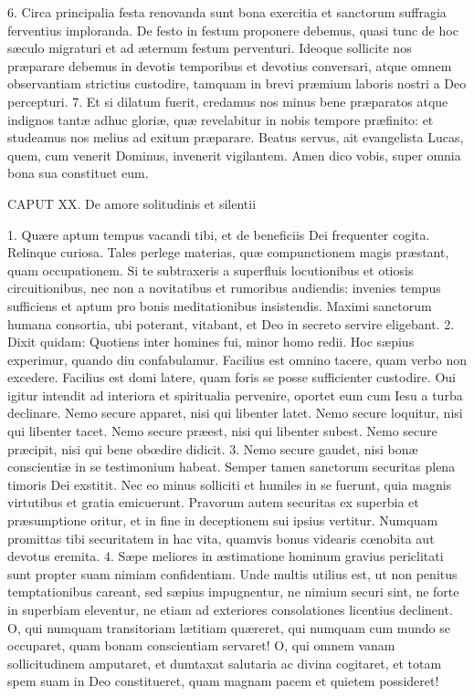 \documentclass[twoside]{article}
\begin{document}
6. Circa principalia festa renovanda sunt bona exercitia et sanctorum suffragia ferventius imploranda. De festo in festum proponere debemus, quasi tunc de hoc sæculo migraturi et ad æternum festum perventuri. Ideoque sollicite nos præparare debemus in devotis temporibus et devotius conversari, atque omnem observantiam strictius custodire, tamquam in brevi præmium laboris nostri a Deo percepturi.
7. Et si dilatum fuerit, credamus nos minus bene præparatos atque indignos tantæ adhuc gloriæ, quæ revelabitur in nobis tempore præfinito: et studeamus nos melius ad exitum præparare. Beatus servus, ait evangelista Lucas, quem, cum venerit Dominus, invenerit vigilantem. Amen dico vobis, super omnia bona sua constituet eum.


CAPUT XX.
De amore solitudinis et silentii

1. Quære aptum tempus vacandi tibi, et de beneficiis Dei frequenter cogita. Relinque curiosa. Tales perlege materias, quæ compunctionem magis præstant, quam occupationem. Si te subtraxeris a superfluis locutionibus et otiosis circuitionibus, nec non a novitatibus et rumoribus audiendis: invenies tempus sufficiens et aptum pro bonis meditationibus insistendis. Maximi sanctorum humana consortia, ubi poterant, vitabant, et Deo in secreto servire eligebant.
2. Dixit quidam: Quotiens inter homines fui, minor homo redii. Hoc sæpius experimur, quando diu confabulamur. Facilius est omnino tacere, quam verbo non excedere. Facilius est domi latere, quam foris se posse sufficienter custodire. Oui igitur intendit ad interiora et spiritualia pervenire, oportet eum cum Iesu a turba declinare. Nemo secure apparet, nisi qui libenter latet. Nemo secure loquitur, nisi qui libenter tacet. Nemo secure præest, nisi qui libenter subest. Nemo secure præcipit, nisi qui bene obœdire didicit.
3. Nemo secure gaudet, nisi bonæ conscientiæ in se testimonium habeat. Semper tamen sanctorum securitas plena timoris Dei exstitit. Nec eo minus solliciti et humiles in se fuerunt, quia magnis virtutibus et gratia emicuerunt. Pravorum autem securitas ex superbia et præsumptione oritur, et in fine in deceptionem sui ipsius vertitur. Numquam promittas tibi securitatem in hac vita, quamvis bonus videaris cœnobita aut devotus eremita.
4. Sæpe meliores in æstimatione hominum gravius periclitati sunt propter suam nimiam confidentiam. Unde multis utilius est, ut non penitus temptationibus careant, sed sæpius impugnentur, ne nimium securi sint, ne forte in superbiam eleventur, ne etiam ad exteriores consolationes licentius declinent. O, qui numquam transitoriam lætitiam quæreret, qui numquam cum mundo se occuparet, quam bonam conscientiam servaret! O, qui omnem vanam sollicitudinem amputaret, et dumtaxat salutaria ac divina cogitaret, et totam spem suam in Deo constitueret, quam magnam pacem et quietem possideret!
\end{document}

